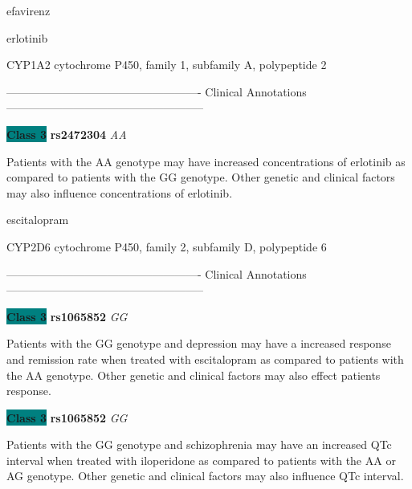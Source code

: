 \documentclass{resume} %
\begin{document}
\begin{rSection}{ efavirenz }
\end{rSection}\begin{rSection}{ erlotinib }
\item[]

\begin{rSubsection}{ CYP1A2 }{ cytochrome P450, family 1, subfamily A, polypeptide 2 }{}{}
\item[]

\item[] ---------------------------------------------------- Clinical Annotations -----------------------------------------------------\newline
\item \textbf{\colorbox{teal} {Class 3}} \textbf{ rs2472304 } \textit{ AA }
\item[] Patients with the AA genotype may have increased concentrations of erlotinib as compared to patients with the GG genotype. Other genetic and clinical factors may also influence concentrations of erlotinib.
\end{rSubsection}

\end{rSection}\begin{rSection}{ escitalopram }
\item[]

\begin{rSubsection}{ CYP2D6 }{ cytochrome P450, family 2, subfamily D, polypeptide 6 }{}{}
\item[]

\item[] ---------------------------------------------------- Clinical Annotations -----------------------------------------------------\newline
\item \textbf{\colorbox{teal} {Class 3}} \textbf{ rs1065852 } \textit{ GG }
\item[] Patients with the GG genotype and depression may have a increased response and remission rate when treated with escitalopram as compared to patients with the AA genotype. Other genetic and clinical factors may also effect patients response.\item \textbf{\colorbox{teal} {Class 3}} \textbf{ rs1065852 } \textit{ GG }
\item[] Patients with the GG genotype and schizophrenia may have an increased QTc interval when treated with iloperidone as compared to patients with the AA or AG genotype. Other genetic and clinical factors may also influence QTc interval.
\end{rSubsection}


\end{rSection}
\end{document}
